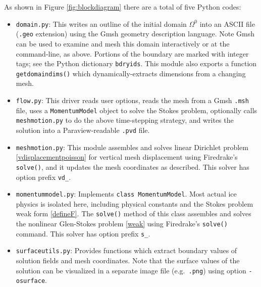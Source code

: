 \documentclass[letterpaper,final,12pt,reqno]{amsart}
\begin{document}
\medskip
As shown in Figure \ref{fig:blockdiagram} there are a total of five Python codes:
\begin{itemize}
\item \texttt{domain.py}: \quad  This writes an outline of the initial domain $\Omega^0$ into an ASCII file (\texttt{.geo} extension) using the Gmsh \cite{GeuzaineRemacle2009} geometry description language.  Note Gmsh can be used to examine and mesh this domain interactively or at the command-line, as above.  Portions of the boundary are marked with integer tags; see the Python dictionary \texttt{bdryids}.  This module also exports a function \texttt{getdomaindims()} which dynamically-extracts dimensions from a changing mesh.

\item \texttt{flow.py}: \quad  This driver reads user options, reads the mesh from a Gmsh \texttt{.msh} file, uses a \texttt{MomentumModel} object to solve the Stokes problem, optionally calls \texttt{meshmotion.py} to do the above time-stepping strategy, and writes the solution into a Paraview-readable \texttt{.pvd} file.

\item \texttt{meshmotion.py}: \quad  This module assembles and solves linear Dirichlet problem \eqref{vdisplacementpoisson} for vertical mesh displacement using Firedrake's \texttt{solve()}, and it updates the mesh coordinates as described.  This solver has option prefix \texttt{vd\_}.

\item \texttt{momentummodel.py}: \quad  Implements \texttt{class MomentumModel}.  Most actual ice physics is isolated here, including physical constants and the Stokes problem weak form \eqref{defineF}.  The \texttt{solve()} method of this class assembles and solves the nonlinear Glen-Stokes problem \eqref{weak} using Firedrake's \texttt{solve()} command.  This solver has option prefix \texttt{s\_}.

\item \texttt{surfaceutils.py}: \quad  Provides functions which extract boundary values of solution fields and mesh coordinates.  Note that the surface values of the solution can be visualized in a separate image file (e.g.~\texttt{.png}) using option \texttt{-osurface}.
\end{itemize}
\end{document}
